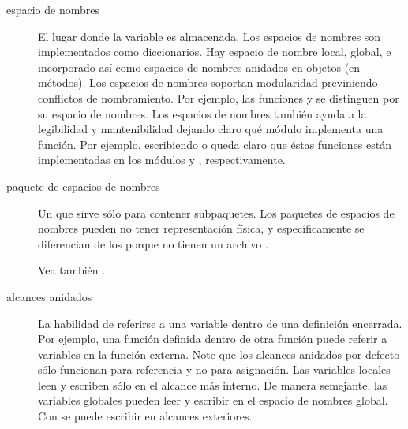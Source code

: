 \documentclass[a4,10pt,spanish]{sphinxmanual}
\begin{document}
\begin{description}
\item[{espacio de nombres\label{\detokenize{glossary:term-namespace}}}] \leavevmode
\sphinxAtStartPar
El lugar donde la variable es almacenada.  Los espacios de nombres son implementados como diccionarios.  Hay espacio de nombre local, global, e incorporado así como espacios de nombres anidados en objetos (en métodos).  Los espacios de nombres soportan modularidad previniendo conflictos de nombramiento.  Por ejemplo, las funciones  y  se distinguen por su espacio de nombres.  Los espacios de nombres también ayuda a la legibilidad y mantenibilidad dejando claro qué módulo implementa una función.  Por ejemplo, escribiendo  o  queda claro que éstas funciones están implementadas en los módulos  y , respectivamente.

\item[{paquete de espacios de nombres\label{\detokenize{glossary:term-namespace-package}}}] \leavevmode
\sphinxAtStartPar
Un  {\hyperref[\detokenize{glossary:term-package}]{}} que sirve sólo para contener subpaquetes.  Los paquetes de espacios de nombres pueden no tener representación física, y específicamente se diferencian de los {\hyperref[\detokenize{glossary:term-regular-package}]{}} porque no tienen un archivo .

\sphinxAtStartPar
Vea también {\hyperref[\detokenize{glossary:term-module}]{}}.

\item[{alcances anidados\label{\detokenize{glossary:term-nested-scope}}}] \leavevmode
\sphinxAtStartPar
La habilidad de referirse a una variable dentro de una definición encerrada.  Por ejemplo, una función definida dentro de otra función puede referir a variables en la función externa.  Note que los alcances anidados por defecto sólo funcionan para referencia y no para asignación.  Las variables locales leen y escriben sólo en el alcance más interno.  De manera semejante, las variables globales pueden leer y escribir en el espacio de nombres global.  Con  se puede escribir en alcances exteriores.


\end{description}
\end{document}
